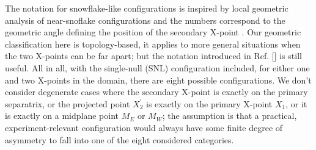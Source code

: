 The notation for snowflake-like configurations is inspired by local
geometric analysis of near-snoflake configurations and the numbers
correspond to the geometric angle defining the position of the
secondary X-point \cite{Ryutov2010}. Our geometric classification here
is topology-based, it applies to more general situations when the two
X-points can be far apart; but the notation introduced in
Ref. [\cite{Ryutov2010}] is still useful. All in all, with the
single-null (SNL) configuration included, for either one and two
X-points in the domain, there are eight possible configurations. We
don't consider degenerate cases where the secondary X-point is exactly
on the primary separatrix, or the projected point $X^{\prime}_2$ is
exactly on the primary X-point $X_1$, or it is exactly on a midplane
point $M_E$ or $M_W$; the assumption is that a practical, experiment-relevant configuration
would always have some finite degree of asymmetry to fall into one of
the eight considered categories.
